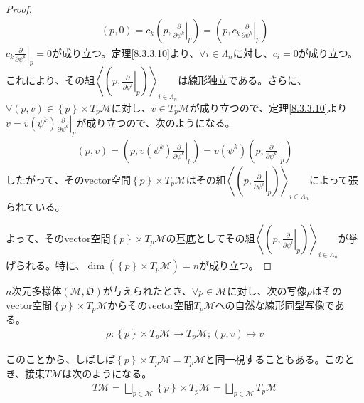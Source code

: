 \documentclass[dvipdfmx]{jsarticle}
\begin{document}
\begin{proof}
  \begin{align*}
    \left(p,0\right) = c_k \left(p,\left.\frac{\partial }{\partial \psi^k } \right|_p \right) =\left(p,c_k \left.\frac{\partial }{\partial \psi^k } \right|_p \right)
  \end{align*}
  $c_k \left.\frac{\partial }{\partial \psi^k } \right|_p =0$が成り立つ。定理\ref{8.3.3.10}より、$\forall i\in \varLambda_n $に対し、$c_i =0$が成り立つ。これにより、その組$\left\langle \left(p,\left.\frac{\partial }{\partial \psi^i } \right|_p \right)\right\rangle_{i\in \varLambda_n }$は線形独立である。さらに、$\forall \left(p,v\right) \in \left\{ p\right\} \times T_p \mathcal{M}$に対し、$v\in T_p \mathcal{M}$が成り立つので、定理\ref{8.3.3.10}より$v=v\left(\psi^k \right) \left. \frac{\partial }{\partial \psi^k }\right|_p $が成り立つので、次のようになる。
  \begin{align*}
    \left(p,v\right) =\left(p,v\left(\psi^k \right) \left. \frac{\partial }{\partial \psi^k }\right|_p \right) =v\left(\psi^k \right) \left(p,\left. \frac{\partial }{\partial \psi^k }\right|_p \right)
  \end{align*}
  したがって、そのvector空間$\left\{p\right\} \times T_p \mathcal{M}$はその組$\left\langle \left(p,\left.\frac{\partial }{\partial \psi^i } \right|_p \right)\right\rangle_{i\in \varLambda_n }$によって張られている。\par
  よって、そのvector空間$\left\{ p\right\} \times T_p \mathcal{M}$の基底としてその組$\left\langle \left(p,\left.\frac{\partial }{\partial \psi^i } \right|_p \right)\right\rangle_{i\in \varLambda_n }$が挙げられる。特に、$\dim \left( \left\{ p\right\} \times T_p \mathcal{M} \right) =n$が成り立つ。
\end{proof}\begin{thm}\label{8.3.3.15}
  $n$次元多様体$\left(\mathcal{M},\mathfrak{O}\right)$が与えられたとき、$\forall p\in \mathcal{M}$に対し、次の写像$\rho $はそのvector空間$\left\{ p\right\} \times T_p \mathcal{M}$からそのvector空間$T_p \mathcal{M}$への自然な線形同型写像である。
  \begin{align*}
    \rho : \left\{ p\right\} \times T_p \mathcal{M} \rightarrow T_p \mathcal{M} ;\left(p,v\right) \mapsto v
  \end{align*}
\end{thm}\par
このことから、しばしば$\left\{p\right\} \times T_p \mathcal{M} =T_p \mathcal{M}$と同一視することもある。このとき、接束$T\mathcal{M}$は次のようになる。
\begin{align*}
  T \mathcal{M} =\bigsqcup_{p\in \mathcal{M}} \left\{p\right\} \times T_p \mathcal{M} =\bigsqcup_{p\in \mathcal{M}} T_p \mathcal{M}
\end{align*}
\end{document}
